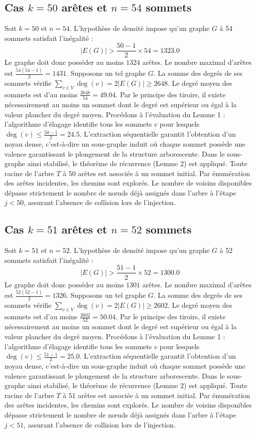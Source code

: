 \documentclass[12pt,a4paper]{article}
\begin{document}
\subsection{Cas $k = 50$ arêtes et $n = 54$ sommets}
Soit $k = 50$ et $n = 54$. L'hypothèse de densité impose qu'un graphe $G$ à 54 sommets satisfait l'inégalité :
$$ |E(G)| > \frac{50-1}{2} \times 54 = 1323.0 $$
Le graphe doit donc posséder au moins $1324$ arêtes. Le nombre maximal d'arêtes est $\frac{54(54-1)}{2} = 1431$.
Supposons un tel graphe $G$. La somme des degrés de ses sommets vérifie $\sum_{v \in V} \deg(v) = 2|E(G)| \geq 2648$.
Le degré moyen des sommets est d'au moins $\frac{2648}{54} = 49.04$.
Par le principe des tiroirs, il existe nécessairement au moins un sommet dont le degré est supérieur ou égal à la valeur plancher du degré moyen.
Procédons à l'évaluation du Lemme 1 : l'algorithme d'élagage identifie tous les sommets $v$ pour lesquels $\deg(v) \leq \frac{50-1}{2} = 24.5$.
L'extraction séquentielle garantit l'obtention d'un noyau dense, c'est-à-dire un sous-graphe induit où chaque sommet possède une valence garantissant le plongement de la structure arborescente.
Dans le sous-graphe ainsi stabilisé, le théorème de récurrence (Lemme 2) est appliqué. Toute racine de l'arbre $T$ à 50 arêtes est associée à un sommet initial. Par énumération des arêtes incidentes, les chemins sont explorés. Le nombre de voisins disponibles dépasse strictement le nombre de nœuds déjà assignés dans l'arbre à l'étape $j < 50$, assurant l'absence de collision lors de l'injection.

\subsection{Cas $k = 51$ arêtes et $n = 52$ sommets}
Soit $k = 51$ et $n = 52$. L'hypothèse de densité impose qu'un graphe $G$ à 52 sommets satisfait l'inégalité :
$$ |E(G)| > \frac{51-1}{2} \times 52 = 1300.0 $$
Le graphe doit donc posséder au moins $1301$ arêtes. Le nombre maximal d'arêtes est $\frac{52(52-1)}{2} = 1326$.
Supposons un tel graphe $G$. La somme des degrés de ses sommets vérifie $\sum_{v \in V} \deg(v) = 2|E(G)| \geq 2602$.
Le degré moyen des sommets est d'au moins $\frac{2602}{52} = 50.04$.
Par le principe des tiroirs, il existe nécessairement au moins un sommet dont le degré est supérieur ou égal à la valeur plancher du degré moyen.
Procédons à l'évaluation du Lemme 1 : l'algorithme d'élagage identifie tous les sommets $v$ pour lesquels $\deg(v) \leq \frac{51-1}{2} = 25.0$.
L'extraction séquentielle garantit l'obtention d'un noyau dense, c'est-à-dire un sous-graphe induit où chaque sommet possède une valence garantissant le plongement de la structure arborescente.
Dans le sous-graphe ainsi stabilisé, le théorème de récurrence (Lemme 2) est appliqué. Toute racine de l'arbre $T$ à 51 arêtes est associée à un sommet initial. Par énumération des arêtes incidentes, les chemins sont explorés. Le nombre de voisins disponibles dépasse strictement le nombre de nœuds déjà assignés dans l'arbre à l'étape $j < 51$, assurant l'absence de collision lors de l'injection.
\end{document}
